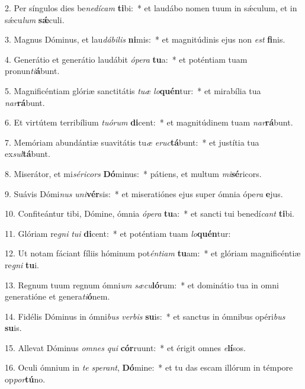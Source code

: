 2. Per síngulos dies be\textit{ne}\textit{dí}\textit{cam} \textbf{ti}bi:~*  et laudábo nomen tuum in sǽculum, et in sǽcu\textit{lum} \textbf{sǽ}culi.\

3. Magnus Dóminus, et lau\textit{dá}\textit{bi}\textit{lis} \textbf{ni}mis:~*  et magnitúdinis ejus non \textit{est} \textbf{fi}nis.\

4. Generátio et generátio laudábit \textit{ó}\textit{pe}\textit{ra} \textbf{tu}a:~*  et poténtiam tuam pronun\textit{ti}\textbf{á}bunt.\

5. Magnificéntiam glóriæ sanctitátis \textit{tu}\textit{æ} \textit{lo}\textbf{quén}tur:~*  et mirabília tua \textit{nar}\textbf{rá}bunt.\

6. Et virtútem terribílium \textit{tu}\textit{ó}\textit{rum} \textbf{di}cent:~*  et magnitúdinem tuam \textit{nar}\textbf{rá}bunt.\

7. Memóriam abundántiæ suavitátis tu\textit{æ} \textit{e}\textit{ruc}\textbf{tá}bunt:~*  et justítia tua ex\textit{sul}\textbf{tá}bunt.\

8. Miserátor, et mi\textit{sé}\textit{ri}\textit{cors} \textbf{Dó}minus:~*  pátiens, et multum \textit{mi}\textbf{sé}ricors.\

9. Suávis Dómi\textit{nus} \textit{u}\textit{ni}\textbf{vér}sis:~*  et miseratiónes ejus super ómnia ópe\textit{ra} \textbf{e}jus.\

10. Confiteántur tibi, Dómine, ómnia \textit{ó}\textit{pe}\textit{ra} \textbf{tu}a:~*  et sancti tui benedí\textit{cant} \textbf{ti}bi.\

11. Glóriam re\textit{gni} \textit{tu}\textit{i} \textbf{di}cent:~*  et poténtiam tuam \textit{lo}\textbf{quén}tur:\

12. Ut notam fáciant fíliis hóminum pot\textit{én}\textit{ti}\textit{am} \textbf{tu}am:~*  et glóriam magnificéntiæ re\textit{gni} \textbf{tu}i.\

13. Regnum tuum regnum ómni\textit{um} \textit{sæ}\textit{cu}\textbf{ló}rum:~*  et dominátio tua in omni generatióne et genera\textit{ti}\textbf{ó}nem.\

14. Fidélis Dóminus in ómni\textit{bus} \textit{ver}\textit{bis} \textbf{su}is:~*  et sanctus in ómnibus opéri\textit{bus} \textbf{su}is.\

15. Allevat Dóminus \textit{om}\textit{nes} \textit{qui} \textbf{cór}ruunt:~*  et érigit omnes \textit{e}\textbf{lí}sos.\

16. Oculi ómnium in \textit{te} \textit{spe}\textit{rant}, \textbf{Dó}mine:~*  et tu das escam illórum in témpore op\textit{por}\textbf{tú}no.\

